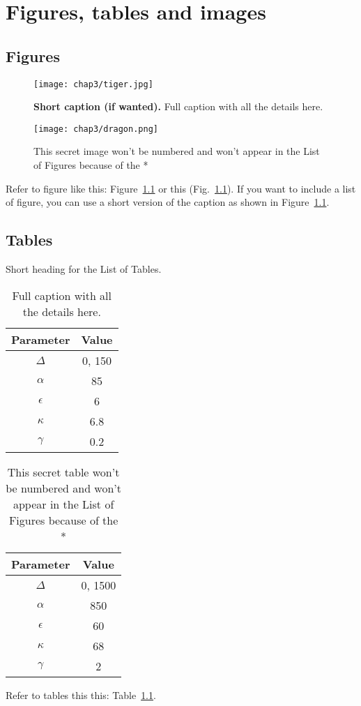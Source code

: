 \chapter{Figures, tables and images} \label{chap-3}

\section{Figures}

\begin{figure}
\center
\texttt{[image: chap3/tiger.jpg]} 
\caption[Short caption for List of Figures]{{\bfseries Short caption (if wanted).} Full caption with all the details here.}
\label{fig-example}
\end{figure}

\begin{figure}
\center
\texttt{[image: chap3/dragon.png]} 
\caption*{This secret image won't be numbered and won't appear in the List of Figures because of the *}
\end{figure}

Refer to figure like this: Figure~\ref{fig-example} or this (Fig.~\ref{fig-example}). If you want to include a list of figure, you can use a short version of the caption as shown in Figure~\ref{fig-example}.


\section{Tables}

\begin{table} 
\center
\caption{Short heading for the List of Tables.}
\begin{tabular}{c|c}
Parameter & Value \\ \hline \hline
$\Delta$ & 0, 150 \\
${\alpha}$ & 85 \\
${\epsilon}$ & 6 \\
${\kappa}$ & 6.8 \\
${\gamma}$ & 0.2
\end{tabular}
\label{tab-values}
\caption*{Full caption with all the details here.}
\end{table}

\begin{table} \center
\begin{tabular}{c|c}
Parameter & Value \\ \hline \hline
$\Delta$ & 0, 1500 \\
${\alpha}$ & 850 \\
${\epsilon}$ & 60 \\
${\kappa}$ & 68 \\
${\gamma}$ & 2
\end{tabular}
\caption*{This secret table won't be numbered and won't appear in the List of Figures because of the * }
\end{table}


Refer to tables this this: Table~\ref{tab-values}.